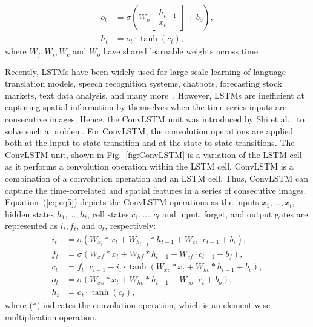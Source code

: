 \begin{sloppypar}
	\begin{equation}
		\begin{aligned}
			o_{t} &=\sigma\left(W_{o} 
			\left[
			\begin{array}{c}
				h_{t-1} \\ x_{t}
			\end{array} 
			\right]
			+b_{o}\right), \\
			h_{t} &=o_{t} \cdot \tanh \left(c_{t}\right),
		\end{aligned}
		\label{eq:eq4}
	\end{equation} 
	where \(W_{f}, W_{i}, W_{c}\) and \(W_{o}\) have shared learnable weights across time.

	Recently, LSTMs have been widely used for large-scale learning of language 
	translation models, speech recognition systems, chatbots, forecasting stock 
	markets, \DIFaddbegin {}\DIFaddend text data analysis, and many 
	more~\DIFdelbegin {}\DIFdelend \DIFaddbegin {}\DIFaddend . 
	However, LSTMs are inefficient at capturing spatial information by themselves when the time series inputs are consecutive images.
	Hence, the ConvLSTM unit was introduced by Shi et al.~\cite{xingjian2015convolutional} to solve such a problem.
	For ConvLSTM, the convolution operations are applied both at the input-to-state transition and at the state-to-state transitions.  
	The ConvLSTM unit, shown in Fig.~\ref{fig:ConvLSTM} is a variation of the LSTM cell as it performs a convolution operation within the LSTM cell.
	ConvLSTM is a combination of a convolution operation and an LSTM cell.
	Thus, ConvLSTM can capture the time-correlated and spatial features in a series of consecutive images.
	Equation~(\ref{eq:eq5}) depicts the ConvLSTM operations as the inputs \(x_1, \dots, x_t\), hidden states \(h_1, \dots, h_t\), cell states \(c_1, \dots, c_t\) and input, forget, and output gates are represented as \(i_t, f_t\), and \(o_t\), respectively:
	\begin{equation}
		\begin{aligned}
			i_{t} &=\sigma\left(W_{x_t} * x_{t}+W_{h_{t-1}} * h_{t-1}+W_{c i} \cdot c_{t-1}+b_{i}\right),
			\\
			f_{t} &=\sigma\left(W_{x f} * x_{t}+W_{h f} * h_{t-1}+W_{c f} \cdot c_{t-1}+b_{f}\right), \\
			c_{t} &=f_{t} \cdot c_{t-1}+i_{t} \cdot \tanh \left(W_{x c} * x_{t}+W_{h c} * h_{t-1}+b_{c}\right), 
			\\
			o_{t} &=\sigma\left(W_{x o} * x_{t}+W_{h o} * h_{t-1}+W_{c o} \cdot c_{t}+b_{o}\right), \\
			h_{t} &=o_{t} \cdot \tanh \left(c_{t}\right),
		\end{aligned}
		\label{eq:eq5}
	\end{equation}
	where (\(*\)) indicates the convolution operation, which is an element-wise multiplication operation.


\end{sloppypar}
